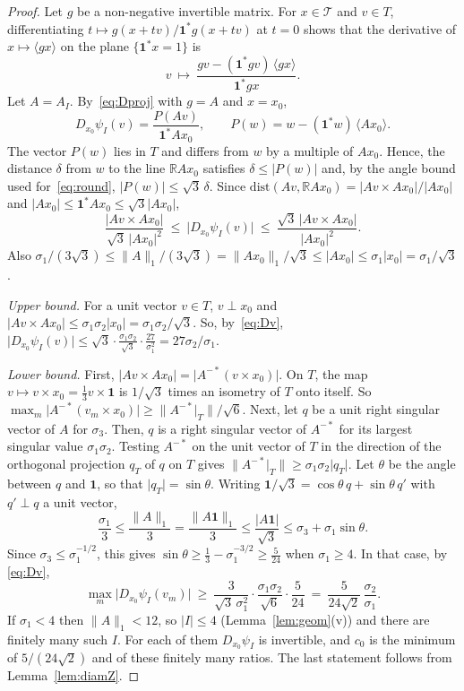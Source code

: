 \documentclass[11pt]{amsart}
\theoremstyle{definition}
\theoremstyle{remark}
\newcommand{\one}{\mathbf 1}
\newcommand{\R}{\mathbb R}
\newcommand{\cT}{\mathcal T}
\newcommand{\abs}[1]{\lvert #1\rvert}
\newcommand{\norm}[1]{\lVert #1\rVert}
\newcommand{\pr}[1]{\langle #1\rangle}
\begin{document}
\begin{proof}
    Let $g$ be a non-negative invertible matrix. 
    For $x\in\cT$ and $v\in T$, differentiating $t\mapsto g(x+tv)/\one^*g(x+tv)$ at $t=0$ shows that the derivative of $x\mapsto\pr{gx}$ on the plane $\{\one^*x=1\}$ is
\begin{equation}\label{eq:Dproj}
  v\ \longmapsto\ \frac{gv-(\one^*gv)\,\pr{gx}}{\one^*gx} .
\end{equation}
    Let $A=A_I$. 
    By~\eqref{eq:Dproj} with $g=A$ and $x=x_0$,
\[
  D_{x_0}\psi_I(v)=\frac{P(Av)}{\one^*Ax_0},\qquad P(w)=w-(\one^*w)\,\pr{Ax_0} .
\]
    The vector $P(w)$ lies in $T$ and differs from $w$ by a multiple of $Ax_0$. 
    Hence, the distance $\delta$ from $w$ to the line $\R Ax_0$ satisfies $\delta\le\abs{P(w)}$ and, by the angle bound used for~\eqref{eq:round}, $\abs{P(w)}\le\sqrt3\,\delta$. 
    Since $\mathrm{dist}(Av,\R Ax_0)=\abs{Av\times Ax_0}/\abs{Ax_0}$ and $\abs{Ax_0}\le\one^*Ax_0\le\sqrt3\abs{Ax_0}$,
\begin{equation}\label{eq:Dv}
  \frac{\abs{Av\times Ax_0}}{\sqrt3\,\abs{Ax_0}^2}\ \le\ \abs{D_{x_0}\psi_I(v)}\ \le\
  \frac{\sqrt3\,\abs{Av\times Ax_0}}{\abs{Ax_0}^2}.
\end{equation}
    Also $\sigma_1/(3\sqrt3)\le\norm A_1/(3\sqrt3)=\norm{Ax_0}_1/\sqrt3\le\abs{Ax_0}\le\sigma_1\abs{x_0}=\sigma_1/\sqrt3$.

    \emph{Upper bound.} For a unit vector $v\in T$, $v\perp x_0$ and $\abs{Av\times Ax_0}\le\sigma_1\sigma_2\abs{x_0}=\sigma_1\sigma_2/\sqrt3$. So, by~\eqref{eq:Dv}, $\abs{D_{x_0}\psi_I(v)}\le\sqrt3\cdot\frac{\sigma_1\sigma_2}{\sqrt3}\cdot\frac{27}{\sigma_1^2}=27\sigma_2/\sigma_1$.

    \emph{Lower bound.} First, $\abs{Av\times Ax_0}=\abs{A^{-*}(v\times x_0)}$. On $T$, the map $v\mapsto v\times x_0=\frac13v\times\one$ is $1/\sqrt3$ times an isometry of $T$ onto itself. 
    So $\max_m\abs{A^{-*}(v_m\times x_0)}\ge\norm{A^{-*}|_T}/\sqrt6$.
    Next, let $q$ be a unit right singular vector of $A$ for $\sigma_3$. 
    Then, $q$ is a right singular vector of $A^{-*}$ for its largest singular value $\sigma_1\sigma_2$. 
    Testing $A^{-*}$ on the unit vector of $T$ in the direction of the orthogonal projection $q_T$ of $q$ on $T$ gives $\norm{A^{-*}|_T}\ge\sigma_1\sigma_2\abs{q_T}$.
    Let $\theta$ be the angle between $q$ and $\one$, so that $\abs{q_T}=\sin\theta$. 
    Writing $\one/\sqrt3=\cos\theta\,q+\sin\theta\,q'$ with $q'\perp q$ a unit vector,
\[
  \frac{\sigma_1}3\le\frac{\norm A_1}3=\frac{\norm{A\one}_1}{3}\le\frac{\abs{A\one}}{\sqrt3}
  \le\sigma_3+\sigma_1\sin\theta .
\]
    Since $\sigma_3\le\sigma_1^{-1/2}$, this gives $\sin\theta\ge\frac13-\sigma_1^{-3/2}\ge\frac5{24}$ when $\sigma_1\ge4$. 
    In that case, by \eqref{eq:Dv},
\[
  \max_m\abs{D_{x_0}\psi_I(v_m)}\ \ge\ \frac{3}{\sqrt3\,\sigma_1^2}\cdot\frac{\sigma_1\sigma_2}{\sqrt6}\cdot\frac5{24}
  \ =\ \frac5{24\sqrt2}\,\frac{\sigma_2}{\sigma_1}.
\]
    If $\sigma_1<4$ then $\norm A_1<12$, so $\abs I\le4$ (Lemma~\ref{lem:geom}(v)) and there are finitely many such $I$.
    For each of them $D_{x_0}\psi_I$ is invertible, and $c_0$ is the minimum of $5/(24\sqrt2)$ and of these finitely many ratios. 
    The last statement follows from Lemma~\ref{lem:diamZ}.
\end{proof}
\end{document}
